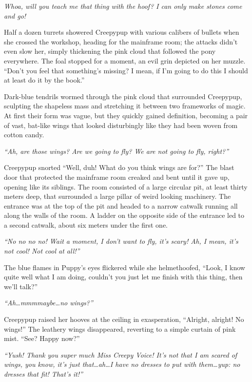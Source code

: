 \emph{Whoa, will you teach me that thing with the hoof? I can only make stones come and go!}

Half a dozen turrets showered Creepypup with various calibers of bullets when she crossed the workshop, heading for the mainframe room; the attacks didn't even slow her, simply thickening the pink cloud that followed the pony everywhere. The foal stopped for a moment, an evil grin depicted on her muzzle. ``Don't you feel that something's missing? I mean, if I'm going to do this I should at least do it by the book.''

Dark-blue tendrils wormed through the pink cloud that surrounded Creepypup, sculpting the shapeless mass and stretching it between two frameworks of magic. At first their form was vague, but they quickly gained definition, becoming a pair of vast, bat-like wings that looked disturbingly like they had been woven from cotton candy.

\emph{``Ah, are those wings? Are we going to fly? We are not going to fly, right?''}

Creepypup snorted ``Well, duh! What do you think wings are for?'' The blast door that protected the mainframe room creaked and bent until it gave up, opening like its siblings. The room consisted of a large circular pit, at least thirty meters deep, that surrounded a large pillar of weird looking machinery. The entrance was at the top of the pit and headed to a narrow catwalk running all along the walls of the room. A ladder on the opposite side of the entrance led to a second catwalk, about six meters under the first one.

\emph{``No no no no! Wait a moment, I don't want to fly, it's scary! Ah, I mean, it's not cool! Not cool at all!''}

The blue flames in Puppy's eyes flickered while she helmethoofed, ``Look, I know quite well what I am doing, couldn't you just let me finish with this thing, then we'll talk?''

\emph{``Ah\dots mmmmaybe\dots no wings?''}

Creepypup raised her hooves at the ceiling in exasperation, ``Alright, alright! No wings!'' The leathery wings disappeared, reverting to a simple curtain of pink mist. ``See? Happy now?''

\emph{``Yush! Thank you super much Miss Creepy Voice! It's not that I am scared of wings, you know, it's just that\dots ah\dots I have no dresses to put with them\dots yup: no dresses that fit! That's it!''}

